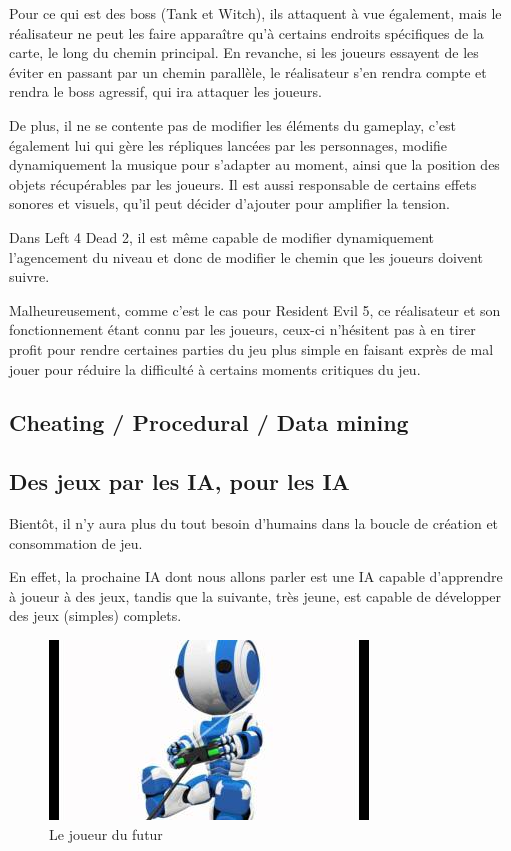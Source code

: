 \documentclass[a4paper, 12pt]{article} %
\begin{document}
Pour ce qui est des boss (Tank et Witch), ils attaquent à vue également, mais le réalisateur ne peut les faire apparaître qu’à certains endroits spécifiques de la carte, le long du chemin principal. En revanche, si les joueurs essayent de les éviter en passant par un chemin parallèle, le réalisateur s’en rendra compte et rendra le boss agressif, qui ira attaquer les joueurs.

De plus, il ne se contente pas de modifier les éléments du gameplay, c’est également lui qui gère les répliques lancées par les personnages, modifie dynamiquement la musique pour s’adapter au moment, ainsi que la position des objets récupérables par les joueurs. Il est aussi responsable de certains effets sonores et visuels, qu’il peut décider d’ajouter pour amplifier la tension.

Dans Left 4 Dead 2, il est même capable de modifier dynamiquement l’agencement du niveau et donc de modifier le chemin que les joueurs doivent suivre.

Malheureusement, comme c’est le cas pour Resident Evil 5, ce réalisateur et son fonctionnement étant connu par les joueurs, ceux-ci n’hésitent pas à en tirer profit pour rendre certaines parties du jeu plus simple en faisant exprès de mal jouer pour réduire la difficulté à certains moments critiques du jeu.

\newpage
\subsection{Cheating / Procedural / Data mining}

\newpage
\subsection{Des jeux par les IA, pour les IA}

Bientôt, il n’y aura plus du tout besoin d’humains dans la boucle de création et consommation de jeu.

En effet, la prochaine IA dont nous allons parler est une IA capable d’apprendre à joueur à des jeux, tandis que la suivante, très jeune, est capable de développer des jeux (simples) complets.

\begin{figure}[!h]%
	\begin{center} 
		\includegraphics[width=0.60\columnwidth]{images/robotplaying.jpg}%
		\caption{Le joueur du futur}%
	\end{center}
\end{figure}
\end{document}
